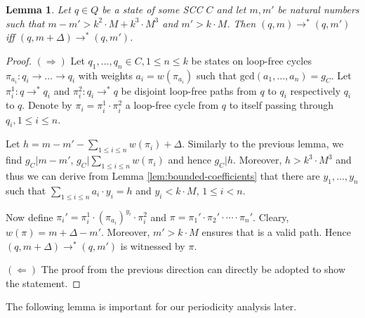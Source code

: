 \documentclass[times,envcountsame]{llncs}
\newtheorem{lemma}[theorem]{{\bf Lemma}}
\begin{document}
\begin{lemma}
  Let $q\in Q$ be a state of some SCC $C$ and let $m,m'$ be natural
  numbers such that $m-m'>k^2\cdot M+ k^3\cdot M^3$ and $m'>k\cdot
  M$. Then $(q,m)\rightarrow^*(q,m')$ iff
  $(q,m+\Delta)\rightarrow^*(q,m')$.
\end{lemma}
\begin{proof}
  $(\Rightarrow)$ Let $q_1,\ldots,q_n\in C, 1\le n\le k$ be states on
  loop-free cycles $\pi_{a_i}:q_i\rightarrow \ldots \rightarrow q_i$
  with weights $a_i=w(\pi_{a_i})$ such that
  $\text{gcd}(a_1,\ldots,a_n)=g_C$.  Let $\pi_i^1: q\rightarrow^* q_i$
  and $\pi_i^2: q_i\rightarrow^* q$ be disjoint loop-free paths from
  $q$ to $q_i$ respectively $q_i$ to $q$. Denote by
  $\pi_i=\pi_i^1\cdot \pi_i^2$ a loop-free cycle from $q$ to itself
  passing through $q_i, 1\le i\le n$.

  Let $h=m-m'-\sum_{1\le i\le n}w(\pi_i)+\Delta$. Similarly to the
  previous lemma, we find $g_C|m-m'$, $g_C|\sum_{1\le i\le n}w(\pi_i)$
  and hence $g_C|h$. Moreover, $h>k^3\cdot M^3$ and thus we can derive
  from Lemma \ref{lem:bounded-coefficients} that there are
  $y_1,\ldots, y_n$ such that $\sum_{1\le i\le n}a_i\cdot y_i=h$ and
  $y_i<k\cdot M$, $1\le i<n$.

  Now define $\pi_i'=\pi_i^1\cdot (\pi_{a_i})^{y_i} \cdot \pi_i^2$ and
  $\pi=\pi_1'\cdot\pi_2'\cdot\cdots\cdot\pi_n'$. Cleary,
  $w(\pi)=m+\Delta-m'$. Moreover, $m'> k\cdot M$ ensures that is a
  valid path. Hence $(q,m+\Delta)\rightarrow^*(q,m')$ is witnessed
  by $\pi$.

  $(\Leftarrow)$ The proof from the previous direction can directly
  be adopted to show the statement.
\end{proof}

The following lemma is important for our periodicity analysis later.
\end{document}
